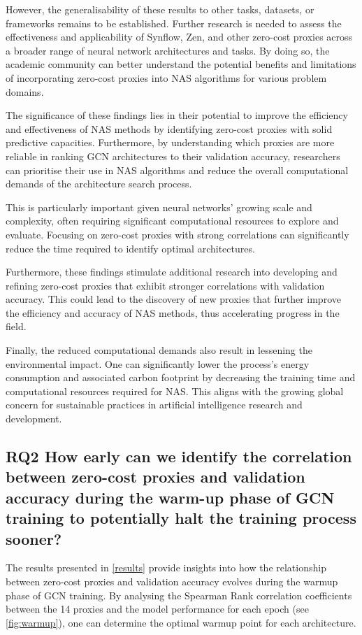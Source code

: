 However, the generalisability of these results to other tasks, datasets, or frameworks remains to be established. Further research is needed to assess the effectiveness and applicability of \gls{Synflow}, Zen, and other zero-cost proxies across a broader range of neural network architectures and tasks. By doing so, the academic community can better understand the potential benefits and limitations of incorporating zero-cost proxies into \gls{NAS} algorithms for various problem domains.  

The significance of these findings lies in their potential to improve the efficiency and effectiveness of \gls{NAS} methods by identifying zero-cost proxies with solid predictive capacities. Furthermore, by understanding which proxies are more reliable in ranking \gls{GCN} architectures to their validation accuracy, researchers can prioritise their use in \gls{NAS} algorithms and reduce the overall computational demands of the architecture search process.

This is particularly important given neural networks' growing scale and complexity, often requiring significant computational resources to explore and evaluate. Focusing on zero-cost proxies with strong correlations can significantly reduce the time required to identify optimal architectures.

Furthermore, these findings stimulate additional research into developing and refining zero-cost proxies that exhibit stronger correlations with validation accuracy. This could lead to the discovery of new proxies that further improve the efficiency and accuracy of \gls{NAS} methods, thus accelerating progress in the field.

Finally, the reduced computational demands also result in lessening the environmental impact. One can significantly lower the process's energy consumption and associated carbon footprint by decreasing the training time and computational resources required for \gls{NAS}. This aligns with the growing global concern for sustainable practices in artificial intelligence research and development.


\subsection{RQ2 How early can we identify the correlation between zero-cost proxies and validation accuracy during the warm-up phase of GCN training to potentially halt the training process sooner?}

The results presented in \cref{results} provide insights into how the relationship between zero-cost proxies and validation accuracy evolves during the warmup phase of \gls{GCN} training. By analysing the Spearman Rank correlation coefficients between the 14 proxies and the model performance for each epoch (see \cref{fig:warmup}), one can determine the optimal warmup point for each architecture.

